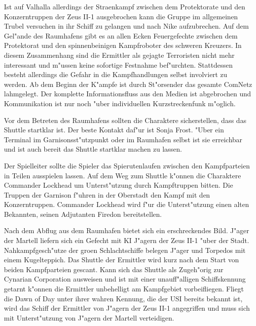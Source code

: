 Ist auf Valhalla allerdings der Stra\3enkampf zwischen dem Protektorate und den Konzerntruppen der Zeus II-1 ausgebrochen kann die Gruppe im allgemeinen Trubel versuchen in ihr Schiff zu gelangen und nach Nike aufzubrechen. Auf dem Gel"ande des Raumhafens gibt es an allen Ecken Feuergefechte zwischen dem Protektorat und den spinnenbeinigen Kampfroboter des schweren Kreuzers. In diesem Zusammenhang sind die Ermittler als gejagte Terroristen nicht mehr interessant und  m"ussen keine sofortige Festnahme bef"urchten. Stattdessen besteht allerdings die Gefahr in die Kampfhandlungen selbst involviert zu werden. Ab dem Beginn der K"ampfe ist durch St"orsender das gesamte ComNetz lahmgelegt. Der komplette Informationsfluss aus den Medien ist abgebrochen und Kommunikation ist nur noch "uber individuellen Kurzstreckenfunk m"oglich.

Vor dem Betreten des Raumhafens sollten die Charaktere sicherstellen, dass das Shuttle startklar ist. Der beste Kontakt daf"ur ist Sonja Frost. "Uber ein Terminal im Garnisonsst"utzpunkt oder im Raumhafen selbst ist sie erreichbar und ist auch bereit das Shuttle startklar machen zu lassen.

Der Spielleiter sollte die Spieler das Spie\3rutenlaufen zwischen den Kampfparteien in Teilen ausspielen lassen. Auf  dem Weg zum Shuttle k"onnen die Charaktere Commander Lockhead um Unterst"utzung durch Kampftruppen bitten. Die Truppen der Garnison f"uhren in der Oberstadt den Kampf mit den Konzerntruppen. Commander Lockhead wird f"ur die Unterst"utzung einen alten Bekannten, seinen Adjutanten Firedon bereitstellen.

Nach dem Abflug aus dem Raumhafen bietet sich ein erschreckendes Bild. J"ager der Martell liefern sich ein Gefecht mit KI J"agern der Zeus II-1 "uber der Stadt. Nahkampfgesch"utze der gro\3en Schlachtschiffe belegen J"ager und Torpedos mit einem Kugelteppich. Das Shuttle der Ermittler wird kurz nach dem Start von beiden Kampfparteien gescant. Kann sich das 
Shuttle als Zugeh"orig zur Cynarian Corporation ausweisen und ist mit einer unauff"alligen Schiffskennung getarnt k"onnen 
die Ermittler unbehelligt am Kampfgebiet vorbeifliegen. Fliegt die Dawn of Day unter ihrer wahren Kennung, die der USI bereits bekannt ist, wird das Schiff der Ermittler von J"agern der Zeus II-1 angegriffen und muss sich mit Unterst"utzung von J"agern der Martell verteidigen.

